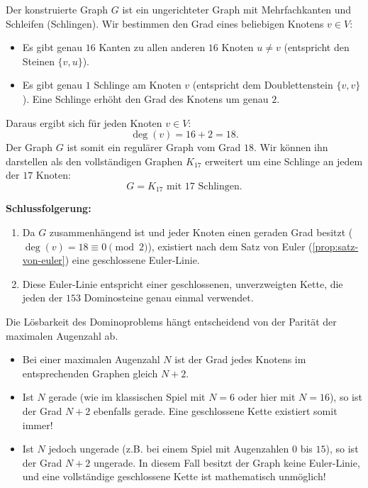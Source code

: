 \begin{math-stroke}
\begin{ai-global-state-checkpoint-invisible-content}
\end{ai-global-state-checkpoint-invisible-content}

Der konstruierte Graph $G$ ist ein ungerichteter Graph mit Mehrfachkanten und Schleifen (Schlingen). Wir bestimmen den Grad eines beliebigen Knotens $v \in V$:
\begin{itemize}
    \item Es gibt genau $16$ Kanten zu allen anderen $16$ Knoten $u \neq v$ (entspricht den Steinen $\{v, u\}$).
    \item Es gibt genau $1$ Schlinge am Knoten $v$ (entspricht dem Doublettenstein $\{v, v\}$). Eine Schlinge erhöht den Grad des Knotens um genau $2$.
\end{itemize}
Daraus ergibt sich für jeden Knoten $v \in V$:
\[
\deg(v) = 16 + 2 = 18.
\]
Der Graph $G$ ist somit ein regulärer Graph vom Grad $18$. Wir können ihn darstellen als den vollständigen Graphen $K_{17}$ erweitert um eine Schlinge an jedem der $17$ Knoten:
\[
G = K_{17} \text{ mit } 17 \text{ Schlingen.}
\]

\textbf{Schlussfolgerung:}
\begin{enumerate}[label=\textbf{(\arabic*)}]
    \item Da $G$ zusammenhängend ist und jeder Knoten einen geraden Grad besitzt ($\deg(v) = 18 \equiv 0 \pmod 2$), existiert nach dem Satz von Euler (\cref{prop:satz-von-euler}) eine geschlossene Euler-Linie.
    \item Diese Euler-Linie entspricht einer geschlossenen, unverzweigten Kette, die jeden der $153$ Dominosteine genau einmal verwendet.
\end{enumerate}
\end{math-stroke}

\begin{didactic-insight}
Die Lösbarkeit des Dominoproblems hängt entscheidend von der Parität der maximalen Augenzahl ab. 
\begin{itemize}
    \item Bei einer maximalen Augenzahl $N$ ist der Grad jedes Knotens im entsprechenden Graphen gleich $N + 2$.
    \item Ist $N$ gerade (wie im klassischen Spiel mit $N=6$ oder hier mit $N=16$), so ist der Grad $N+2$ ebenfalls gerade. Eine geschlossene Kette existiert somit immer!
    \item Ist $N$ jedoch ungerade (z.B. bei einem Spiel mit Augenzahlen $0$ bis $15$), so ist der Grad $N+2$ ungerade. In diesem Fall besitzt der Graph keine Euler-Linie, und eine vollständige geschlossene Kette ist mathematisch unmöglich!
\end{itemize}
\end{didactic-insight}

